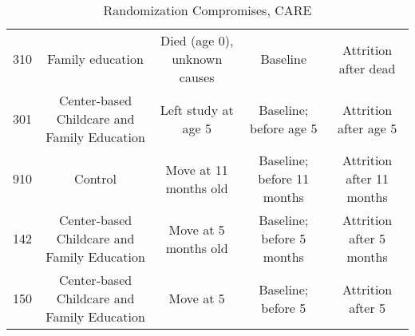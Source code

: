 \begin{sidewaystable}[H] 
\begin{threeparttable}
\caption{Randomization Compromises, CARE}
\label{table:care_compromises}
\centering
\footnotesize
\begin{tabular}{ccccc} \toprule
310 & Family education & Died (age 0), unknown causes & Baseline & Attrition after dead \\
301 & Center-based Childcare and Family Education  & Left study at age 5  & Baseline; before age 5 & Attrition after age 5 \\
910 & Control & Move at 11 months old & Baseline; before 11 months & Attrition after 11 months \\
142 & Center-based Childcare and Family Education & Move at 5 months old & Baseline; before 5 months & Attrition after 5 months \\
150 & Center-based Childcare and Family Education & Move at 5 & Baseline; before 5 & Attrition after 5 \\ \bottomrule
\end{tabular}
\end{threeparttable}
\end{sidewaystable}